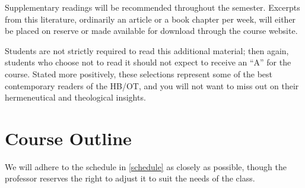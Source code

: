 \documentclass[titlepage]{article}
\begin{document}
Supplementary readings will be recommended throughout the semester.
Excerpts from this literature, ordinarily an article or a book chapter
per week, will either be placed on reserve or made available for
download through the course website.

Students are not strictly required to read this additional material;
then again, students who choose not to read it should not expect to
receive an ``A'' for the course. Stated more positively, these
selections represent some of the best contemporary readers of the HB/OT,
and you will not want to miss out on their hermeneutical and theological
insights.

\section{Course Outline}
\label{outline}

We will adhere to the schedule in \autoref{schedule} as closely as
possible, though the professor reserves the right to adjust it to suit
the needs of the class.

\newcommand\HBFB[1]{\cite[#1]{hbfb}}
\end{document}
